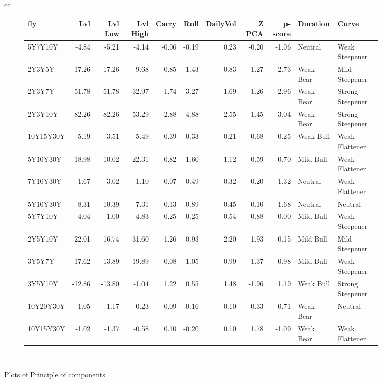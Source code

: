 \documentclass[a4paper,oneside]{report}
\begin{document}
\begin{figure}[htbp]
\begin{tabular}[c]{cc}
 \begin{subfigure}[c]{0.5\textwidth}
 \begin{adjustbox}{max width=\textwidth}
 \begin{tabular}{lrrrrrrrrll}
\hline
       fly &    Lvl &  Lvl Low &  Lvl High &  Carry &  Roll &  DailyVol &  Z PCA &  p-score &   Duration &             Curve \\
\hline
   5Y7Y10Y &  -4.84 &    -5.21 &     -4.14 &  -0.06 & -0.19 &      0.23 &  -0.20 &    -1.06 &    Neutral &    Weak Steepener \\
    2Y3Y5Y & -17.26 &   -17.26 &     -9.68 &   0.85 &  1.43 &      0.83 &  -1.27 &     2.73 &  Weak Bear &    Mild Steepener \\
    2Y3Y7Y & -51.78 &   -51.78 &    -32.97 &   1.74 &  3.27 &      1.69 &  -1.26 &     2.96 &  Weak Bear &  Strong Steepener \\
   2Y3Y10Y & -82.26 &   -82.26 &    -53.29 &   2.88 &  4.88 &      2.55 &  -1.45 &     3.04 &  Weak Bear &  Strong Steepener \\
 10Y15Y30Y &   5.19 &     3.51 &      5.49 &   0.39 & -0.33 &      0.21 &   0.68 &     0.25 &  Weak Bull &    Weak Flattener \\
  5Y10Y30Y &  18.98 &    10.02 &     22.31 &   0.82 & -1.60 &      1.12 &  -0.59 &    -0.70 &  Mild Bull &    Weak Flattener \\
  7Y10Y30Y &  -1.67 &    -3.02 &     -1.10 &   0.07 & -0.49 &      0.32 &   0.20 &    -1.32 &    Neutral &    Weak Flattener \\
  5Y10Y30Y &  -8.31 &   -10.39 &     -7.31 &   0.13 & -0.89 &      0.45 &  -0.10 &    -1.68 &    Neutral &           Neutral \\
   5Y7Y10Y &   4.04 &     1.00 &      4.83 &   0.25 & -0.25 &      0.54 &  -0.88 &     0.00 &  Mild Bull &    Weak Steepener \\
   2Y5Y10Y &  22.01 &    16.74 &     31.60 &   1.26 & -0.93 &      2.20 &  -1.93 &     0.15 &  Mild Bull &    Mild Steepener \\
    3Y5Y7Y &  17.62 &    13.89 &     19.89 &   0.08 & -1.05 &      0.99 &  -1.37 &    -0.98 &  Mild Bull &    Weak Steepener \\
   3Y5Y10Y & -12.86 &   -13.80 &     -1.04 &   1.22 &  0.55 &      1.48 &  -1.96 &     1.19 &  Weak Bull &  Strong Steepener \\
 10Y20Y30Y &  -1.05 &    -1.17 &     -0.23 &   0.09 & -0.16 &      0.10 &   0.33 &    -0.71 &  Weak Bear &           Neutral \\
 10Y15Y30Y &  -1.02 &    -1.37 &     -0.58 &   0.10 & -0.20 &      0.10 &   1.78 &    -1.09 &  Weak Bear &    Weak Flattener \\
\hline
\end{tabular}
\end{adjustbox}
 \end{subfigure}\\
 
 
 
\end{tabular}
 \caption{Plots of Principle of components}\label{fig:bubble plots}
 \end{figure}
 
\end{document}
